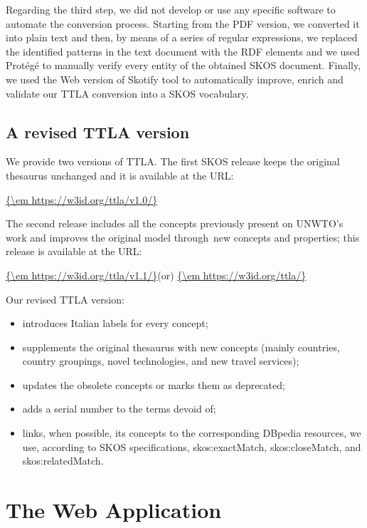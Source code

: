 \documentclass[runningheads,a4paper]{llncs}
\begin{document}
Regarding the third step, we did not develop or use any specific software to automate the conversion process. Starting from the PDF version, we converted it into plain text and then, by means of a series of regular expressions, we replaced the identified patterns in the text document with the RDF elements and we used Prot\'eg\'e to manually verify every entity of the obtained SKOS document. Finally, we used the Web version of Skotify tool  \cite{_Ref364511568} to automatically improve, enrich and validate our TTLA conversion into a SKOS vocabulary.

\subsection{A revised TTLA version}

We provide two versions of TTLA. The first SKOS release keeps the original thesaurus unchanged and it is available at the URL:

\url{{\em https://w3id.org/ttla/v1.0/}}

The second release includes all the concepts previously present on UNWTO's work and improves the original model through new concepts and properties; this release is available at the URL:

\url{{\em https://w3id.org/ttla/v1.1/}}{\em }(or) \url{{\em https://w3id.org/ttla/}}

Our revised TTLA version:
\begin{itemize}
\item introduces Italian labels for every concept;
\item supplements the original thesaurus with new concepts (mainly countries, country groupings, novel technologies, and new travel services); 
\item updates the obsolete concepts or marks them as deprecated; 
\item adds a serial number to the terms devoid of;
\item links, when possible,  its concepts to the corresponding DBpedia resources,  we use, according to SKOS specifications, skos:exactMatch, skos:closeMatch, and skos:relatedMatch.
\end{itemize}

\section{The Web Application}
\end{document}
